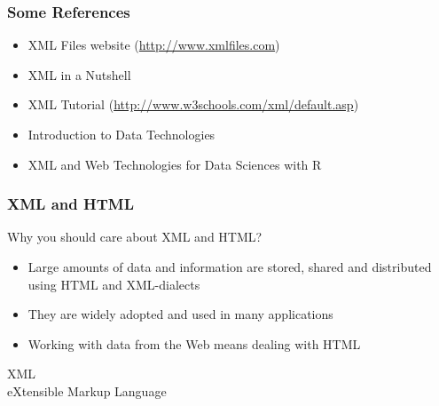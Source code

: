 \documentclass{beamer}\usepackage[]{graphicx}\usepackage[]{color}
\begin{document}
\begin{frame}
\frametitle{Some References}

\begin{itemize}
 \item XML Files website {\scriptsize (\url{http://www.xmlfiles.com})} \\
 \item XML in a  Nutshell \\
 \item XML Tutorial {\scriptsize (\url{http://www.w3schools.com/xml/default.asp})} \\
 \item Introduction to Data Technologies \\
 \item XML and Web Technologies for Data Sciences with R \\
\end{itemize}

\end{frame}


\begin{frame}
\frametitle{XML and HTML}

\begin{block}{Why you should care about XML and HTML?}
\begin{itemize}
  \item Large amounts of data and information are stored, shared and distributed using HTML and XML-dialects
  \item They are widely adopted and used in many applications
  \item Working with data from the Web means dealing with HTML
 \end{itemize}
\end{block}

\end{frame}



\begin{frame}
 \begin{center}
  {\Huge \textcolor{mandarina}{XML}} \\
  \bigskip
  {\Large \textcolor{mandarina}{eXtensible Markup Language}}
 \end{center}
\end{frame}
\end{document}
